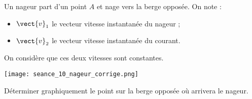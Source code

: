 \documentclass[a4paper]{tufte-handout}
\begin{document}
\bigskip

\begin{fullwidth}
  \exo Un nageur part d'un point $A$ et nage vers la berge opposée. On note :
  \begin{itemize}
    \item $\vect{v}_1$ le vecteur vitesse instantanée du nageur ;
    \item $\vect{v}_2$ le vecteur vitesse instantanée du courant.
  \end{itemize}
  On considère que ces deux vitesses sont constantes.

  \begin{center}
    \texttt{[image: seance\_10\_nageur\_corrige.png]}  
  \end{center}

  Déterminer graphiquement le point sur la berge opposée où arrivera le nageur.
\end{fullwidth}
\end{document}
